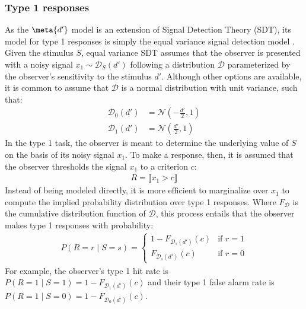 \subsubsection{Type 1 responses}
As the $\meta{d'}$ model is an extension of Signal Detection Theory (SDT), its model for type 1 responses is simply the equal variance signal detection model \parencite{green1966, clarke1959}. Given the stimulus $S$, equal variance SDT assumes that the observer is presented with a noisy signal $x_1 \sim \mathcal{D}_S(d')$ following a distribution $\mathcal{D}$ parameterized by the observer's sensitivity to the stimulus $d'$. Although other options are available, it is common to assume that $\mathcal{D}$ is a normal distribution with unit variance, such that:
\begin{align*}
    \mathcal{D}_0(d') &= \mathcal{N}\left(-\frac{d'}{2}, 1\right) \\
    \mathcal{D}_1(d') &= \mathcal{N}\left(\frac{d'}{2}, 1\right)
\end{align*}
In the type 1 task, the observer is meant to determine the underlying value of $S$ on the basis of its noisy signal $x_1$. To make a response, then, it is assumed that the observer thresholds the signal $x_1$ to a criterion $c$:
\begin{align*}
    R = \llbracket x_1 > c\rrbracket
\end{align*}
Instead of being modeled directly, it is more efficient to marginalize over $x_1$ to compute the implied probability distribution over type 1 responses. 
Where $F_{\mathcal{D}}$ is the cumulative distribution function of $\mathcal{D}$, this process entails that the observer makes type 1 responses with probability:
\begin{align*}
    P(R=r \;\vert\; S=s) = \begin{cases}
        1 - F_{\mathcal{D}_{s}(d')}(c) & \textrm{if }r=1 \\
        F_{\mathcal{D}_{s}(d')}(c)  & \textrm{if }r=0
    \end{cases}
\end{align*}
For example, the observer's type 1 hit rate is $P(R=1 \;\vert\; S=1) = 1 - F_{\mathcal{D}_{1}(d')}(c)$ and their type 1 false alarm rate is $P(R=1 \;\vert\; S=0) = 1 - F_{\mathcal{D}_{0}(d')}(c)$.


